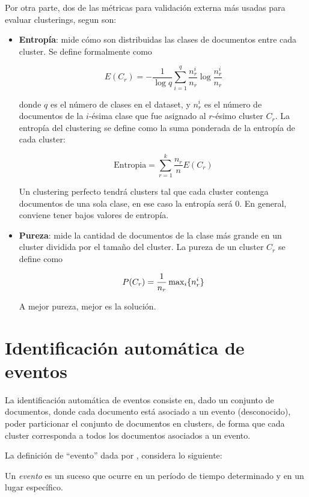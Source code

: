     Por otra parte, dos de las métricas para validación externa más
    usadas para evaluar clusterings, segun
    \cite{Zhao02criterionfunctions} son:

\begin{itemize}
\item \textbf{Entropía}: mide cómo son distribuidas las clases de documentos
      entre cada cluster. Se define formalmente como

      $$E(C_r) = -\frac{1}{\log q}\sum_{i=1}^q\frac{n^i_r}{n_r}\log\frac{n^i_r}{n_r}$$

      donde $q$ es el número de clases en el dataset, y $n^i_r$ es el
      número de documentos de la $i$-ésima clase que fue asignado al
      $r$-ésimo cluster $C_r$. La entropía del clustering se define
      como la suma ponderada de la entropía de cada cluster:

      $$\textrm{Entropia} = \sum_{r=1}^k \frac{n_r}{n} E(C_r)$$

      Un clustering perfecto tendrá clusters tal que cada cluster
      contenga documentos de una sola clase, en ese caso la entropía
      será 0. En general, conviene tener bajos valores de entropía.
\item \textbf{Pureza}: mide la cantidad de documentos de la clase más grande
      en un cluster dividida por el tamaño del cluster. La pureza de
      un cluster $C_r$ se define como

      $$P(C_r) = \frac{1}{n_r} \operatorname{max}_i\{n^i_r\}$$

      A mejor pureza, mejor es la solución.
\end{itemize}
\section{Identificación automática de eventos}
\label{sec-2.3}


   La identificación automática de eventos consiste en, dado un
   conjunto de documentos, donde cada documento está asociado a un
   evento (desconocido), poder particionar el conjunto de
   documentos en clusters, de forma que cada cluster corresponda a
   todos los documentos asociados a un evento.

   La definición de ``evento'' dada por
   \cite{Yang:1999:LAD:630307.630471}, considera lo siguiente:

   \begin{defn} Un \emph{evento} es un suceso que ocurre en un período de tiempo
   determinado y en un lugar específico. \end{defn}


